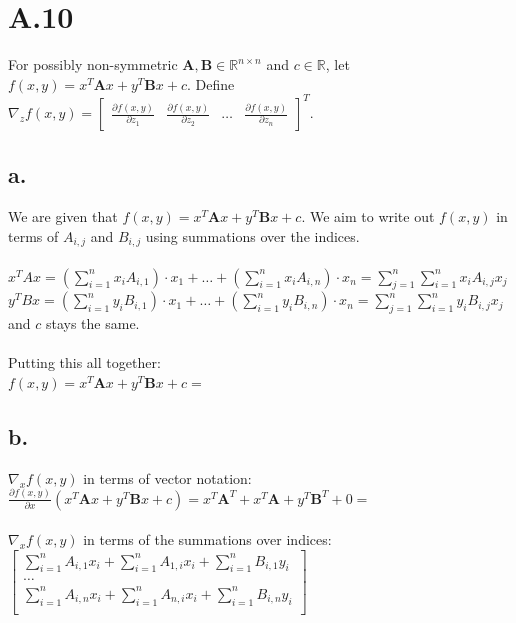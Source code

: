 \documentclass{article}
\newcommand{\field}[1]{\mathbb{#1}}
\newcommand{\1}{\mathbf{1}}
\newcommand{\R}{\field{R}} %
\newcommand{\mat}[1]{\boldsymbol{#1}} %
\begin{document}
\section*{A.10}
{\Large 

For possibly non-symmetric $\mat{A}, \mat{B} \in \R^{n \times n}$ and $c \in \R$, let $f(x, y) = x^T \mat{A} x + y^T \mat{B} x + c$. Define $\nabla_z f(x,y) = \begin{bmatrix} \frac{\partial f(x,y)}{\partial z_1} & \frac{\partial f(x,y)}{\partial z_2} & \dots & \frac{\partial f(x,y)}{\partial z_n} \end{bmatrix}^T$.  

\subsection*{a.}
We are given that $f(x, y) = x^T \mat{A} x + y^T \mat{B} x + c$. We aim to write out $f(x, y)$ in terms of $A_{i,j}$ and $B_{i,j}$ using summations over the indices. \\ \\
$x^T A x = (\sum_{i=1}^{n} x_iA_{i, 1}) \cdot x_1 + \dots + (\sum_{i=1}^{n} x_iA_{i, n}) \cdot x_n = \sum_{j=1}^{n} \sum_{i=1}^{n} x_i A_{i,j} x_j$  \\ 
$y^T B x = (\sum_{i=1}^{n} y_iB_{i, 1}) \cdot x_1 + \dots + (\sum_{i=1}^{n} y_iB_{i, n}) \cdot x_n = \sum_{j=1}^{n} \sum_{i=1}^{n} y_i B_{i,j} x_j$ \\
and $c$ stays the same. \\ \\
Putting this all together: \\
$f(x, y) = x^T \mat{A} x + y^T \mat{B} x + c =$ 

\subsection*{b.}
$\nabla_x f(x,y)$ in terms of vector notation: \\
$\frac{\partial f(x,y)}{\partial x}(x^T \mat{A} x + y^T \mat{B} x + c) = x^T\mat{A}^T + x^T\mat{A} + y^T\mat{B}^T + 0 = $ \framebox[1.1\width]{\textbf{$\mat{A}^Tx + \mat{A}x + \mat{B}^Ty$}} \\ \\ 
$\nabla_x f(x,y)$ in terms of the summations over indices: \\ 
$\begin{bmatrix}
\sum_{i=1}^{n} A_{i,1} x_i + \sum_{i=1}^{n} A_{1, i} x_i + \sum_{i=1}^{n} B_{i,1} y_i \\
\dots \\
\sum_{i=1}^{n} A_{i,n} x_i + \sum_{i=1}^{n} A_{n, i} x_i + \sum_{i=1}^{n} B_{i,n} y_i \\
\end{bmatrix}$

}
\end{document}
